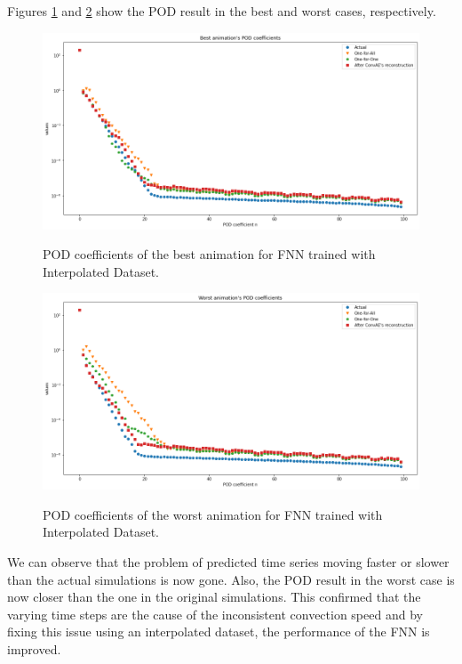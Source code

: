 Figures \ref{figure:FNN_interpolated_best_POD} and \ref{figure:FNN_interpolated_worst_POD} show the POD result in the best and worst cases, respectively.

\begin{figure}[H]
    \centering
    \caption{POD coefficients of the best animation for FNN trained with Interpolated Dataset.}
    \includegraphics[scale=0.4]{figures/mantle_convection_images/larger_dataset_interpolated/FNN_Best_POD.png}
    \label{figure:FNN_interpolated_best_POD}
\end{figure}

\begin{figure}[H]
    \centering
    \caption{POD coefficients of the worst animation for FNN trained with Interpolated Dataset.}
    \includegraphics[scale=0.4]{figures/mantle_convection_images/larger_dataset_interpolated/FNN_Worst_POD.png}
    \label{figure:FNN_interpolated_worst_POD}
\end{figure}

We can observe that the problem of predicted time series moving faster or slower than the actual simulations is now gone. Also, the POD result in the worst case is now closer than the one in the original simulations. This confirmed that the varying time steps are the cause of the inconsistent convection speed and by fixing this issue using an interpolated dataset, the performance of the FNN is improved.


